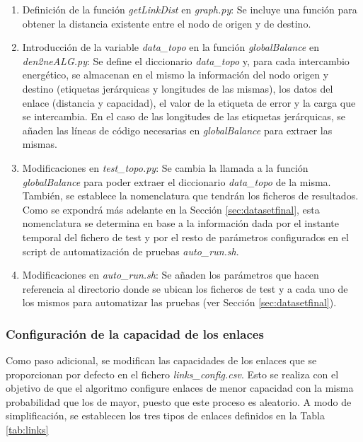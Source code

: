 \begin{enumerate}
    \item Definición de la función \textit{getLinkDist} en \textit{graph.py}: Se incluye una función para obtener la distancia existente entre el nodo de origen y de destino.    
    \item Introducción de la variable \textit{data\_topo} en la función \textit{globalBalance} en \textit{den2neALG.py}: Se define el diccionario \textit{data\_topo} y, para cada intercambio energético, se almacenan en el mismo la información del nodo origen y destino (etiquetas jerárquicas y longitudes de las mismas), los datos del enlace (distancia y capacidad), el valor de la etiqueta de error y la carga que se intercambia. En el caso de las longitudes de las etiquetas jerárquicas, se añaden las líneas de código necesarias en \textit{globalBalance} para extraer las mismas.
    \item Modificaciones en \textit{test\_topo.py}: Se cambia la llamada a la función \textit{globalBalance} para poder extraer el diccionario \textit{data\_topo} de la misma. También, se establece la nomenclatura que tendrán los ficheros de resultados. Como se expondrá más adelante en la Sección \ref{sec:datasetfinal}, esta nomenclatura se determina en base a la información dada por el instante temporal del fichero de test y por el resto de parámetros configurados en el script de automatización de pruebas \textit{auto\_run.sh}.
    \item Modificaciones en \textit{auto\_run.sh}: Se añaden los parámetros que hacen referencia al directorio donde se ubican los ficheros de test y a cada uno de los mismos para automatizar las pruebas (ver Sección \ref{sec:datasetfinal}).
\end{enumerate} 

\subsubsection{Configuración de la capacidad de los enlaces}
Como paso adicional, se modifican las capacidades de los enlaces que se proporcionan por defecto en el fichero \textit{links\_config.csv}. Esto se realiza con el objetivo de que el algoritmo configure enlaces de menor capacidad con la misma probabilidad que los de mayor, puesto que este proceso es aleatorio. A modo de simplificación, se establecen los tres tipos de enlaces definidos en la Tabla \ref{tab:links}

\vspace{3mm}

